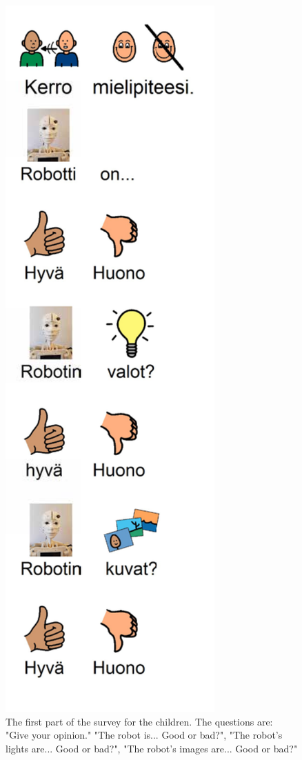 \begin{figure}
\centering
  \includegraphics[scale=0.60]{images/kysely_lapselle_1.pdf}
  \caption{The first part of the survey for the children. The questions are: "Give your opinion." "The robot is... Good or bad?", "The robot's lights are... Good or bad?", "The robot's images are... Good or bad?"}
  \label{fig:kirjelapselle1}
\end{figure}

